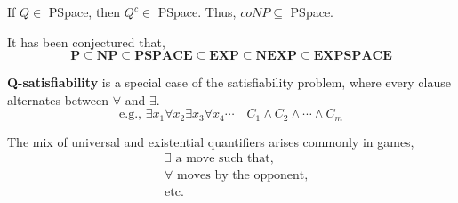  	\begin{rmk}
 		If $Q \in$ PSpace, then $Q^c \in$ PSpace. Thus, $coNP \subseteq$ PSpace.
 	\end{rmk}

 	\begin{rmk}
		It has been conjectured that,
		\[\mathbf{P} \subseteq \mathbf{N P} \subseteq \mathbf{P S P A C E} \subseteq \mathbf{E X P} \subseteq \mathbf{N E X P} \subseteq \mathbf{E X P S P A C E}\]
	\end{rmk}

 	\begin{defn}[Q-Satisfiability]
		\textbf{Q-satisfiability} is a special case of the satisfiability problem, where every clause alternates between $\forall$ and $\exists$.
		\[\text{e.g., }\exists x_{1} \forall x_{2} \exists x_{3} \forall x_{4} \cdots \quad C_{1} \wedge C_{2} \wedge \cdots \wedge C_{m}\]
	\end{defn}

	\begin{marginfigure}
		The mix of universal and existential quantifiers arises commonly in games,
		\begin{align*}
			&\exists \text{ a move such that,} \\
			&\forall \text{ moves by the opponent,} \\
			&\text{etc}.
		\end{align*}
	\end{marginfigure}


